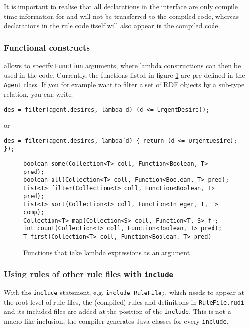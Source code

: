 It is important to realise that all declarations in the interface are only
compile time information for \vonda and will not be transferred to the compiled
code, whereas declarations in the rule code itself will also appear in the
compiled code.

\subsubsection{Functional constructs}

\vonda allows to specify \texttt{Function} arguments, where lambda
constructions can then be used in the code. Currently, the functions listed in
figure \ref{tab:lambda-functions} are pre-defined in the \texttt{Agent} class.
If you for example want to filter a set of RDF objects by a sub-type relation,
you can write:
{\small\begin{lstlisting}
des = filter(agent.desires, lambda(d) (d <= UrgentDesire));
\end{lstlisting}}
or
{\small\begin{lstlisting}
des = filter(agent.desires, lambda(d) { return (d <= UrgentDesire); });
\end{lstlisting}}

\begin{figure}[htbp]
\small%
\begin{lstlisting}
boolean some(Collection<T> coll, Function<Boolean, T> pred);
boolean all(Collection<T> coll, Function<Boolean, T> pred);
List<T> filter(Collection<T> coll, Function<Boolean, T> pred);
List<T> sort(Collection<T> coll, Function<Integer, T, T> comp);
Collection<T> map(Collection<S> coll, Function<T, S> f);
int count(Collection<T> coll, Function<Boolean, T> pred);
T first(Collection<T> coll, Function<Boolean, T> pred);
\end{lstlisting}\vspace*{-2ex}
\caption{\label{tab:lambda-functions}Functions that take lambda expressions as an argument}
\end{figure}


\subsubsection{Using rules of other rule files with \texttt{include}}

With the \texttt{include} statement, e.g. \texttt{include RuleFile;},
which needs to appear at the root level of rule files, the (compiled)
rules and definitions in \texttt{RuleFile.rudi} and its included files
are added at the position of the \texttt{include}. This is not a
macro-like inclusion, the compiler generates Java classes for every
\texttt{include}.

